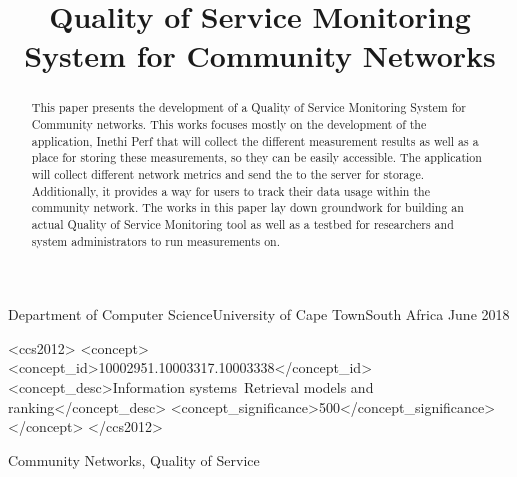 \documentclass[plain]{sigplanconf}
\begin{document}
	\title{Quality of Service Monitoring System for Community Networks}
	{Department of Computer Science\linebreak University of Cape Town\linebreak South Africa}
	{June 2018}
	\maketitle
	\begin{abstract}
		This paper presents the development of a Quality of Service Monitoring System for Community networks.
		This works focuses mostly on the development of the application, Inethi Perf that will collect the different measurement results as well as a place for storing these measurements, so they can be easily accessible.
		The application will collect different network metrics and send the to the server for storage.
		Additionally, it provides a way for users to track their data usage within the community network.
		The works in this paper lay down groundwork for building an actual Quality of Service Monitoring tool as well as a testbed for researchers and system administrators to run measurements on.
	\end{abstract}
	\begin{CCSXML}
		<ccs2012>
		<concept>
		<concept_id>10002951.10003317.10003338</concept_id>
		<concept_desc>Information systems~Retrieval models and ranking</concept_desc>
		<concept_significance>500</concept_significance>
		</concept>
		</ccs2012>
	\end{CCSXML}
	\keywords
	Community Networks, Quality of Service
	
	
	
	
	
	
	
	
	
	
\end{document}
